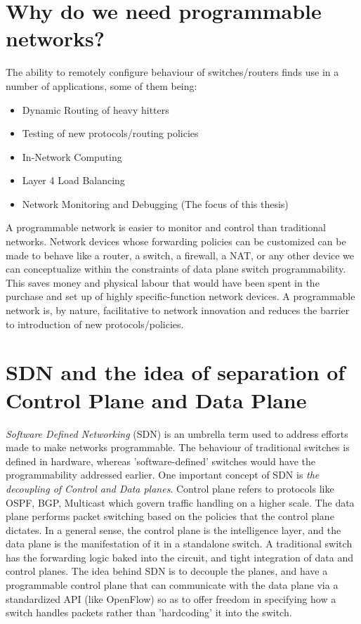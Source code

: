 \section{Why do we need programmable networks?}
The ability to remotely configure behaviour of switches/routers finds use in a number of applications,
some of them being:
\begin{itemize}
  \item Dynamic Routing of heavy hitters
  \item Testing of new protocols/routing policies
  \item In-Network Computing
  \item Layer 4 Load Balancing
  \item Network Monitoring and Debugging (The focus of this thesis)
\end{itemize}
A programmable network is easier to monitor and control than traditional networks. Network devices whose forwarding 
policies can be customized can be made to behave like a router, a switch, a firewall, a NAT, or any other device we can 
conceptualize within the constraints of data plane switch programmability. This saves money and physical labour that would have been
spent in the purchase and set up of highly specific-function network devices. A programmable network is, by nature, facilitative
to network innovation and reduces the barrier to introduction of new protocols/policies.

\section{SDN and the idea of separation of Control Plane and Data Plane}
\emph{Software Defined Networking} (SDN) is an umbrella term used to address efforts made to make networks programmable. The behaviour of
traditional switches is defined in hardware, whereas 'software-defined' switches would have the programmability addressed
earlier. One important concept of SDN is \textit{the decoupling of Control and Data planes}.
Control plane refers to protocols like OSPF, BGP, Multicast which govern traffic handling on a higher scale. The 
data plane performs packet switching based on the policies that the control plane dictates. In a general sense, the control
plane is the intelligence layer, and the data plane is the manifestation of it in a standalone switch.
\newline
A traditional switch has the forwarding logic baked into the circuit, and tight integration of data and control planes.
The idea behind SDN is to decouple the planes, and have a programmable control plane that can communicate with the data plane
via a standardized API (like OpenFlow) so as to offer freedom in specifying how a switch handles packets rather than 'hardcoding'
it into the switch.

